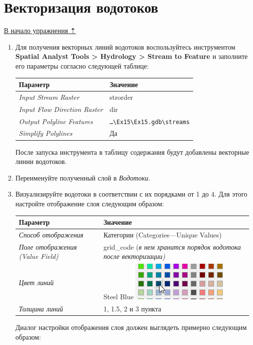 \documentclass[12pt,]{book}
\begin{document}
\hypertarget{dem-vectorize}{%
\section{Векторизация водотоков}\label{dem-vectorize}}

\protect\hyperlink{dem}{В начало упражнения ⇡}

\begin{enumerate}
\def\labelenumi{\arabic{enumi}.}
\item
  Для получения векторных линий водотоков воспользуйтесь инструментом \textbf{Spatial Analyst Tools \textgreater{} Hydrology \textgreater{} Stream to Feature} и заполните его параметры согласно следующей таблице:

  \begin{longtable}[]{@{}ll@{}}
  \toprule
  Параметр & Значение\tabularnewline
  \midrule
  \endhead
  \emph{Input Stream Raster} & strorder\tabularnewline
  \emph{Input Flow Direction Raster} & dir\tabularnewline
  \emph{Output Polyline Features} & \texttt{\ldots{}\textbackslash{}Ex15\textbackslash{}Ex15.gdb\textbackslash{}streams}\tabularnewline
  \emph{Simplify Polylines} & Да\tabularnewline
  \bottomrule
  \end{longtable}

  После запуска инструмента в таблицу содержания будут добавлены векторные линии водотоков.
\item
  Переименуйте полученный слой в \emph{Водотоки}.
\item
  Визуализируйте водотоки в соответствии с их порядками от 1 до 4. Для этого настройте отображение слоя следующим образом:

  \begin{longtable}[]{@{}ll@{}}
  \toprule
  Параметр & Значение\tabularnewline
  \midrule
  \endhead
  \emph{Способ отображения} & Категории (Categories---Unique Values)\tabularnewline
  \emph{Поле отображения (Value Field)} & grid\_code (\emph{в нем хранится порядок водотока после векторизации)}\tabularnewline
  \emph{Цвет линий} & Steel Blue \includegraphics{images/Ex15/image16.png}\tabularnewline
  \emph{Толщина линий} & 1, 1.5, 2 и 3 пункта\tabularnewline
  \bottomrule
  \end{longtable}

  Диалог настройки отображения слоя должен выглядеть примерно следующим образом:


\end{enumerate}
\end{document}
